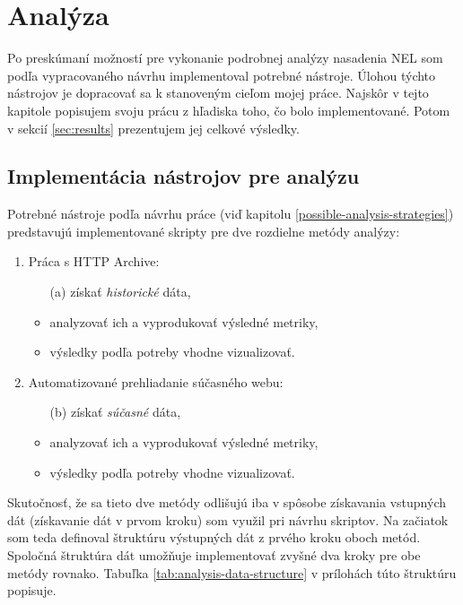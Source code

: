 \chapter{Analýza}
\label{analysis-and-its-results}

Po preskúmaní možností pre vykonanie podrobnej analýzy nasadenia NEL som podľa vypracovaného návrhu implementoval potrebné nástroje.
Úlohou týchto nástrojov je dopracovať sa k stanoveným cieľom mojej práce.  
Najskôr v tejto kapitole popisujem svoju prácu z hľadiska toho, čo bolo implementované.
Potom v sekcií \ref{sec:results} prezentujem jej celkové výsledky.


\section{Implementácia nástrojov pre analýzu}

Potrebné nástroje podľa návrhu práce (viď kapitolu \ref{possible-analysis-strategies}) predstavujú implementované skripty pre dve rozdielne metódy analýzy:
\begin{enumerate}
    \item Práca s HTTP Archive:
    \begin{itemize}
        \item[(a)] získať \textit{historické} dáta, 
        \item analyzovať ich a vyprodukovať výsledné metriky,
        \item výsledky podľa potreby vhodne vizualizovať.
    \end{itemize}

    \item Automatizované prehliadanie súčasného webu:
    \begin{itemize}
        \item[(b)] získať \textit{súčasné} dáta,
        \item analyzovať ich a vyprodukovať výsledné metriky, 
        \item výsledky podľa potreby vhodne vizualizovať.
    \end{itemize}
\end{enumerate}

Skutočnosť, že sa tieto dve metódy odlišujú iba v spôsobe získavania vstupných dát (získavanie dát v prvom kroku) som využil pri návrhu skriptov.
Na začiatok som teda definoval štruktúru výstupných dát z prvého kroku oboch metód.
Spoločná štruktúra dát umožňuje implementovať zvyšné dva kroky pre obe metódy rovnako.
Tabuľka \ref{tab:analysis-data-structure} v prílohách túto štruktúru popisuje. 

